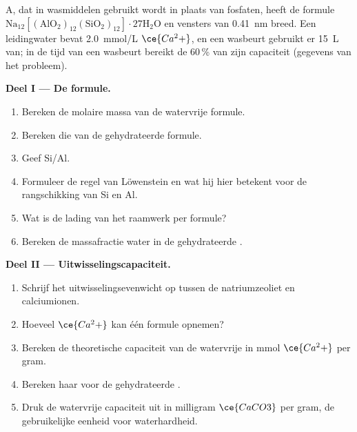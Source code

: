\begin{problem}
\label{pb:b3:inorganic-materials:1}
 A, dat in wasmiddelen gebruikt wordt in plaats van fosfaten, heeft de formule
$\mathrm{Na_{12}[(AlO_2)_{12}(SiO_2)_{12}]\cdot 27H_2O}$ en vensters van \qty{0.41}{nm} breed. Een leidingwater bevat
\qty{2.0}{mmol/L} $\ce{Ca^2+}$, en een wasbeurt gebruikt er \qty{15}{L} van; in de tijd van een wasbeurt bereikt de 
60\,\% van zijn capaciteit (gegevens van het probleem).

\medskip\noindent\textbf{Deel I --- De formule.}
\begin{enumerate}
  \item Bereken de molaire massa van de watervrije formule.
  \item Bereken die van de gehydrateerde formule.
  \item Geef Si/Al.
  \item Formuleer de regel van Löwenstein en wat hij hier betekent voor de
        rangschikking van
        Si en Al.
  \item Wat is de lading van het raamwerk per formule?
  \item Bereken de massafractie water in de gehydrateerde .
\end{enumerate}

\medskip\noindent\textbf{Deel II --- Uitwisselingscapaciteit.}
\begin{enumerate}[resume]
  \item Schrijf het uitwisselingsevenwicht op tussen de natriumzeoliet en
        calciumionen.
  \item Hoeveel $\ce{Ca^2+}$ kan één formule opnemen?
  \item Bereken de theoretische capaciteit van de watervrije  in mmol $\ce{Ca^2+}$
        per gram.
  \item Bereken haar voor de gehydrateerde .
  \item Druk de watervrije capaciteit uit in milligram $\ce{CaCO3}$ per gram, de gebruikelijke
        eenheid voor waterhardheid.
\end{enumerate}


\end{problem}
